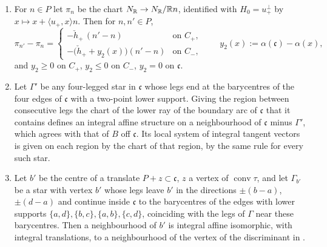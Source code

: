 \begin{lemma}\label{lem:nodegerm}
\begin{enumerate}
\item For $n\in P$ let $\pi_n$ be the chart $N_\mathbb R\to N_\mathbb R/\mathbb R n$, identified with $H_0=u_+^\perp$ by $x\mapsto x+\langle u_+,x\rangle n$.
Then for $n,n'\in P$,
\[
\pi_{n'}-\pi_n=\begin{cases}-\check h_+\,(n'-n)&\text{on }C_+,\\ -\bigl(\check h_++y_2(x)\bigr)(n'-n)&\text{on }C_-,\end{cases}\qquad
y_2(x):=\alpha(\mathfrak c)-\alpha(x),
\]
and $y_2\ge0$ on $C_+$, $y_2\le0$ on $C_-$, $y_2=0$ on $\mathfrak c$.
\item Let $\Gamma'$ be any four-legged star in $\mathfrak c$ whose legs end at the barycentres of the four edges of
$\mathfrak c$ with a two-point lower support. Giving the region between consecutive legs the chart of the lower ray of the
boundary arc of $\mathfrak c$ that it contains defines an integral affine structure on a neighbourhood of $\mathfrak c$
minus $\Gamma'$, which agrees with that of $B$ off $\mathfrak c$. Its local system of integral tangent vectors is given on
each region by the chart of that region, by the same rule for every such star.
\item Let $b'$ be the centre of a translate $P+z\subset\mathfrak c$, $z$ a vertex of $\operatorname{conv}\tau$, and let
$\Gamma_{b'}$ be a star with vertex $b'$ whose legs leave $b'$ in the directions $\pm(b-a)$, $\pm(d-a)$ and continue inside
$\mathfrak c$ to the barycentres of the edges with lower supports $\{a,d\},\{b,c\},\{a,b\},\{c,d\}$, coinciding with the legs of
$\Gamma$ near these barycentres. Then a neighbourhood of $b'$ is integral affine isomorphic, with integral translations, to a
neighbourhood of the vertex of the discriminant in \cite[Ex.~6.1]{CBM}.
\end{enumerate}
\end{lemma}

